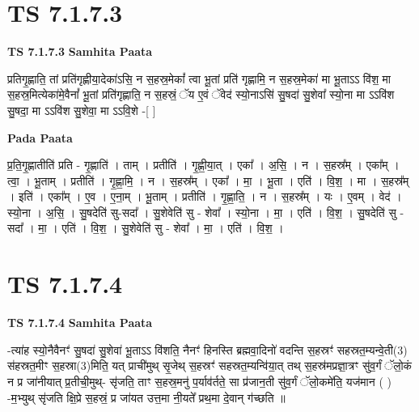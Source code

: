 \documentclass[17pt]{extarticle}
\begin{document}
\section*{ TS 7.1.7.3 }

\textbf{TS 7.1.7.3 } \newline
\textbf{Samhita Paata} \newline

प्रतिगृ॒ह्णाति॒ तां प्रति॑गृह्णीया॒देका॑ऽसि॒ न स॒हस्र॒मेकां᳚ त्वा भू॒तां प्रति॑ गृह्णामि॒ न स॒हस्र॒मेका॑ मा भू॒ताऽऽ वि॑श॒ मा स॒हस्र॒मित्येका॑मे॒वैनां᳚ भू॒तां प्रति॑गृह्णाति॒ न स॒हस्रं॒ ॅय ए॒वं ॅवेद॑ स्यो॒नाऽसि॑ सु॒षदा॑ सु॒शेवा᳚ स्यो॒ना मा ऽऽवि॑श सु॒षदा॒ मा ऽऽवि॑श सु॒शेवा॒ मा ऽऽवि॒शे -[  ] \newline

\textbf{Pada Paata} \newline

प्र॒ति॒गृ॒ह्णातीति॑ प्रति - गृ॒ह्णाति॑ । ताम् । प्रतीति॑ । गृ॒ह्णी॒या॒त् । एका᳚ । अ॒सि॒ । न । स॒हस्र᳚म् । एका᳚म् । त्वा॒ । भू॒ताम् । प्रतीति॑ । गृ॒ह्णा॒मि॒ । न । स॒हस्र᳚म् । एका᳚ । मा॒ । भू॒ता । एति॑ । वि॒श॒ । मा । स॒हस्र᳚म् । इति॑ । एका᳚म् । ए॒व । ए॒ना॒म् । भू॒ताम् । प्रतीति॑ । गृ॒ह्णा॒ति॒ । न । स॒हस्र᳚म् । यः । ए॒वम् । वेद॑ । स्यो॒ना । अ॒सि॒ । सु॒षदेति॑ सु-सदा᳚ । सु॒शेवेति॑ सु - शेवा᳚ । स्यो॒ना । मा॒ । एति॑ । वि॒श॒ । सु॒षदेति॑ सु - सदा᳚ । मा॒ । एति॑ । वि॒श॒ । सु॒शेवेति॑ सु - शेवा᳚ । मा॒ । एति॑ । वि॒श॒ ।  \newline




\section*{ TS 7.1.7.4 }

\textbf{TS 7.1.7.4 } \newline
\textbf{Samhita Paata} \newline

-त्या॑ह स्यो॒नैवैनꣳ॑ सु॒षदा॑ सु॒शेवा॑ भू॒ताऽऽ वि॑शति॒ नैनꣳ॑ हिनस्ति ब्रह्मवा॒दिनो॑ वदन्ति स॒हस्रꣳ॑ सहस्रत॒म्यन्वे॒ती(3) स॑हस्रत॒मीꣳ स॒हस्रा(3)मिति॒ यत् प्राची॑मुथ् सृ॒जेथ् स॒हस्रꣳ॑ सहस्रत॒म्यन्वि॑या॒त् तथ् स॒हस्र॑मप्रज्ञा॒त्रꣳ सु॑व॒र्गं ॅलो॒कं न प्र जा॑नीयात् प्र॒तीची॒मुथ्- सृ॑जति॒ ताꣳ स॒हस्र॒मनु॑ प॒र्याव॑र्तते॒ सा प्र॑जान॒ती सु॑व॒र्गं ॅलो॒कमे॑ति॒ यज॑मान ( ) -म॒भ्युथ् सृ॑जति क्षि॒प्रे स॒हस्रं॒ प्र जा॑यत उत्त॒मा नी॒यते᳚ प्रथ॒मा दे॒वान् ग॑च्छति ॥ \newline
\end{document}
